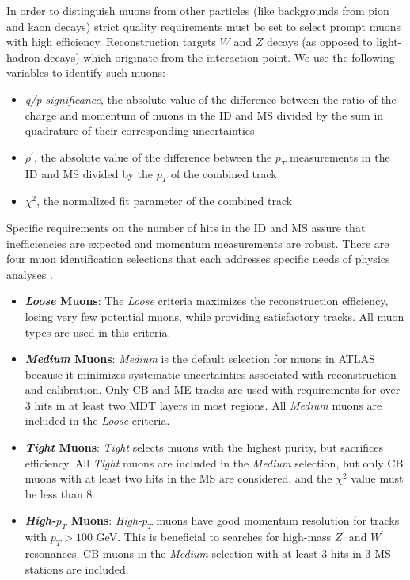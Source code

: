 In order to distinguish muons from other particles (like backgrounds from pion and kaon decays) strict quality requirements must be set to select prompt muons with high efficiency. Reconstruction targets $W$ and $Z$ decays (as opposed to light-hadron decays) which originate from the interaction point. We use the following variables to identify such muons:
\begin{itemize}
\item \textit{q/p significance}, the absolute value of the difference between the ratio of the charge and momentum of muons in the ID and MS divided by the sum in quadrature of their corresponding uncertainties
\item \textit{$\rho^\prime$}, the absolute value of the difference between the $p_T$ measurements in the ID and MS divided by the $p_T$ of the combined track 
\item \textit{$\chi ^2$}, the normalized fit parameter of the combined track
\end{itemize}

Specific requirements on the number of hits in the ID and MS assure that inefficiencies are expected and momentum measurements are robust. There are four muon identification selections that each addresses specific needs of physics analyses \cite{MCPpaper}.

\begin{itemize}
\item \textbf{\textit{Loose} Muons}: The \textit{Loose} criteria maximizes the reconstruction efficiency, losing very few potential muons, while providing satisfactory tracks. All muon types are used in this criteria.
\item \textbf{\textit{Medium} Muons}: \textit{Medium} is the default selection for muons in ATLAS because it minimizes systematic uncertainties associated with reconstruction and calibration. Only CB and ME tracks are used with requirements for over 3 hits in at least two MDT layers in most regions. All \textit{Medium} muons are included in the \textit{Loose} criteria.
\item \textbf{\textit{Tight} Muons}: \textit{Tight} selects muons with the highest purity, but sacrifices efficiency. All \textit{Tight} muons are included in the \textit{Medium} selection, but only CB muons with at least two hits in the MS are considered, and the $\chi^2$ value must be less than $8$.  
\item \textbf{\textit{High-$p_T$} Muons}: \textit{High-$p_T$} muons have good momentum resolution for tracks with $p_T > 100$ GeV. This is beneficial to searches for high-mass $Z^\prime$ and $W^\prime$ resonances. CB muons in the \textit{Medium} selection with at least $3$ hits in $3$ MS stations are included. 
\end{itemize}

